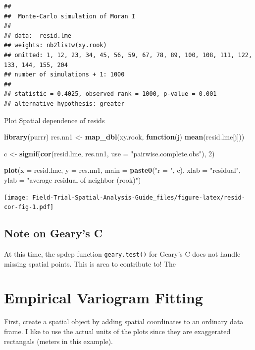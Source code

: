 \documentclass[]{book}
\newenvironment{Shaded}{\begin{snugshade}}{\end{snugshade}}
\newcommand{\ControlFlowTok}[1]{\textcolor[rgb]{0.13,0.29,0.53}{\textbf{#1}}}
\newcommand{\DataTypeTok}[1]{\textcolor[rgb]{0.13,0.29,0.53}{#1}}
\newcommand{\DecValTok}[1]{\textcolor[rgb]{0.00,0.00,0.81}{#1}}
\newcommand{\KeywordTok}[1]{\textcolor[rgb]{0.13,0.29,0.53}{\textbf{#1}}}
\newcommand{\NormalTok}[1]{#1}
\newcommand{\StringTok}[1]{\textcolor[rgb]{0.31,0.60,0.02}{#1}}
\begin{document}
\begin{verbatim}
## 
##  Monte-Carlo simulation of Moran I
## 
## data:  resid.lme 
## weights: nb2listw(xy.rook) 
## omitted: 1, 12, 23, 34, 45, 56, 59, 67, 78, 89, 100, 108, 111, 122, 133, 144, 155, 204 
## number of simulations + 1: 1000 
## 
## statistic = 0.4025, observed rank = 1000, p-value = 0.001
## alternative hypothesis: greater
\end{verbatim}

Plot Spatial dependence of resids

\begin{Shaded}
\begin{Highlighting}[]
\KeywordTok{library}\NormalTok{(purrr)}
\NormalTok{res.nn1 <-}\StringTok{ }\KeywordTok{map_dbl}\NormalTok{(xy.rook, }\ControlFlowTok{function}\NormalTok{(j) }\KeywordTok{mean}\NormalTok{(resid.lme[j]))}
  
\NormalTok{c <-}\StringTok{ }\KeywordTok{signif}\NormalTok{(}\KeywordTok{cor}\NormalTok{(resid.lme, res.nn1, }\DataTypeTok{use =} \StringTok{"pairwise.complete.obs"}\NormalTok{), }\DecValTok{2}\NormalTok{)}

\KeywordTok{plot}\NormalTok{(}\DataTypeTok{x =}\NormalTok{ resid.lme, }\DataTypeTok{y =}\NormalTok{ res.nn1, }
     \DataTypeTok{main =} \KeywordTok{paste0}\NormalTok{(}\StringTok{"r = "}\NormalTok{, c), }\DataTypeTok{xlab =} \StringTok{"residual"}\NormalTok{, }\DataTypeTok{ylab =} \StringTok{"average residual of neighbor (rook)"}\NormalTok{)}
\end{Highlighting}
\end{Shaded}

\texttt{[image: Field-Trial-Spatial-Analysis-Guide\_files/figure-latex/resid-cor-fig-1.pdf]}

\hypertarget{note-on-gearys-c}{%
\subsection{Note on Geary's C}\label{note-on-gearys-c}}

At this time, the spdep function \texttt{geary.test()} for Geary's C does not handle missing spatial points. This is area to contribute to! The

\hypertarget{empirical-variogram-fitting}{%
\section{Empirical Variogram Fitting}\label{empirical-variogram-fitting}}

First, create a spatial object by adding spatial coordinates to an ordinary data frame. I like to use the actual units of the plots since they are exaggerated rectangals (meters in this example).
\end{document}
